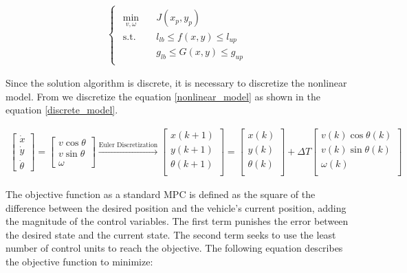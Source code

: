 \begin{align} 
\left\{\begin{matrix} 
\begin{aligned} 
\min_{v,\omega} \quad & J\left ( x_p, y_p \right )\\
\textrm{s.t.} \quad & l_{lb} \le f(x,y) \le l_{up}  \\
  &   g_{lb} \le G(x,y) \le g_{up}  
\end{aligned}
\end{matrix}\right.
\end{align}

Since the solution algorithm is discrete, it is necessary to discretize the nonlinear model. From \cite{mohamed} we discretize the equation \ref{nonlinear_model} as shown in the equation \ref{discrete_model}.

\begin{gather}
\left[ \begin{split}
\dot{x} \\ 
\dot{y} \\
\dot{\theta} 
\end{split} \right] = \left[ \begin{split}
 v \cos{\theta}\\ 
 v \sin{\theta} \\
\omega  
\end{split} \right]
\overset{\text{Euler Discretization}}{\longrightarrow}
\left[ \begin{split}
x(k+1) \\ 
y(k+1) \\
\theta(k+1) \\  
\end{split} \right]
=
\left[ \begin{split}
x(k) \\ 
y(k) \\
\theta(k) \\ 
\end{split} \right]
+ \Delta T
\left[ \begin{split}
 v(k) \cos{\theta}(k)\\ 
 v(k) \sin{\theta}(k) \\
\omega(k)  \\ 
\end{split} \right]
\label{discrete_model}
\end{gather}

The objective function as a standard MPC is defined as the square of the difference between the desired position and the vehicle's current position, adding the magnitude of the control variables. The first term punishes the error between the desired state and the current state. The second term seeks to use the least number of control units to reach the objective. The following equation describes the objective function to minimize:

